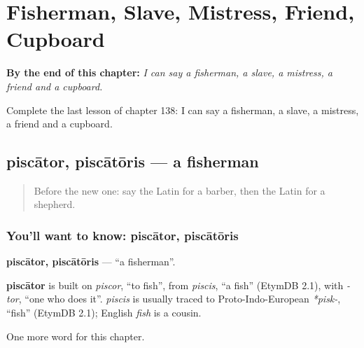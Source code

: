 
\chapter{Fisherman, Slave, Mistress, Friend, Cupboard}
\label{ch:la-fisherman-slave-mistress-friend-cupboard}

\begin{chapteropening}
\textbf{By the end of this chapter:} \emph{I can say a fisherman, a slave, a mistress, a friend and a cupboard.}

Complete the last lesson of chapter 138: I can say a fisherman, a slave, a mistress, a friend and a cupboard.
\end{chapteropening}

\section[piscātor, piscātōris]{piscātor, piscātōris — a fisherman}

\label{lesson:LA-C138-piscator}



\begin{quote}
Before the new one: say the Latin for a barber, then the Latin for a shepherd.
\end{quote}

\subsection*{You'll want to know: piscātor, piscātōris}
\textbf{piscātor, piscātōris} — \textquotedblleft{}a fisherman\textquotedblright{}.

\begin{cousinweb}
\textbf{piscātor} is built on \emph{piscor}, \textquotedblleft{}to fish\textquotedblright{}, from \emph{piscis}, \textquotedblleft{}a fish\textquotedblright{} (EtymDB 2.1), with \emph{-tor}, \textquotedblleft{}one who does it\textquotedblright{}. \emph{piscis} is usually traced to Proto-Indo-European \emph{*pisk-}, \textquotedblleft{}fish\textquotedblright{} (EtymDB 2.1); English \emph{fish} is a cousin.
\end{cousinweb}

\begin{grammarlens}[title={What you've built}]
One more word for this chapter.
\end{grammarlens}

